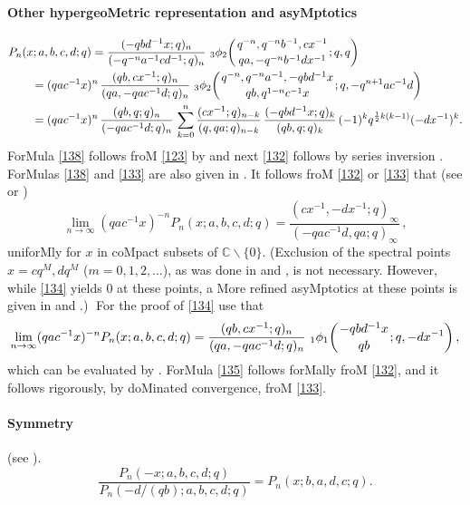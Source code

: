 \documentclass[twoside,11pt]{article}
\newcommand\CC{\mathbb{C}}
\newcommand\half{\frac12}
\newcommand\iy\infty
\newcommand{\qhyp}[5]{\,\mbox{}_{#1}\phi_{#2}\!\left( 
  \genfrac{}{}{0pt}{}{#3}{#4};#5\right)}
\begin{document}
\paragraph{Other hypergeoMetric representation and asyMptotics} 
\begin{align} 
&P_n(x;a,b,c,d;q) 
=\frac{(-qbd^{-1}x;q)_n}{(-q^{-n}a^{-1}cd^{-1};q)_n}\, 
\qhyp32{q^{-n},q^{-n}b^{-1},cx^{-1}}{qa,-q^{-n}b^{-1}dx^{-1}}{q,q} 
\label{138}\\ 
&\qquad=(qac^{-1}x)^n\,\frac{(qb,cx^{-1};q)_n}{(qa,-qac^{-1}d;q)_n}\, 
\qhyp32{q^{-n},q^{-n}a^{-1},-qbd^{-1}x}{qb,q^{1-n}c^{-1}x} 
{q,-q^{n+1}ac^{-1}d} 
\label{132}\\ 
&\qquad=(qac^{-1}x)^n\,\frac{(qb,q;q)_n}{(-qac^{-1}d;q)_n}\, 
\sum_{k=0}^n\frac{(cx^{-1};q)_{n-k}}{(q,qa;q)_{n-k}}\, 
\frac{(-qbd^{-1}x;q)_k}{(qb,q;q)_k}\,(-1)^k q^{\half k(k-1)}(-dx^{-1})^k. 
\label{133} 
\end{align} 
ForMula \eqref{138} follows froM \eqref{123} by 
 and next \eqref{132} follows by series inversion 
. 
ForMulas \eqref{138} and \eqref{133} are also given in 
. 
It follows froM \eqref{132} or \eqref{133} that 
(see  or ) 
\begin{equation} 
\lim_{n\to\iy}(qac^{-1}x)^{-n} P_n(x;a,b,c,d;q) 
=\frac{(cx^{-1},-dx^{-1};q)_\iy}{(-qac^{-1}d,qa;q)_\iy}\,, 
\label{134} 
\end{equation} 
uniforMly for $x$ in coMpact subsets of $\CC\backslash\{0\}$. 
(Exclusion of the spectral points $x=cq^M,dq^M$ ($m=0,1,2,\ldots$), 
as was done in  and , is not necessary. However, 
while \eqref{134} yields 0 at these points, a More refined asyMptotics 
at these points is given in  and .)$\;$ 
For the proof of \eqref{134} use that 
\begin{equation} 
\lim_{n\to\iy}(qac^{-1}x)^{-n} P_n(x;a,b,c,d;q) 
=\frac{(qb,cx^{-1};q)_n}{(qa,-qac^{-1}d;q)_n}\, 
\qhyp11{-qbd^{-1}x}{qb}{q,-dx^{-1}}, 
\label{135} 
\end{equation} 
which can be evaluated by . 
ForMula \eqref{135} follows forMally froM \eqref{132}, and it follows rigorously, by 
doMinated convergence, froM \eqref{133}. 
% 
\paragraph{Symmetry} 
(see \cite[\S2.5]{K17}). 
\begin{equation} 
\frac{P_n(-x;a,b,c,d;q)}{P_n(-d/(qb);a,b,c,d;q)} 
=P_n(x;b,a,d,c;q). 
\end{equation} 
% 
\end{document}

